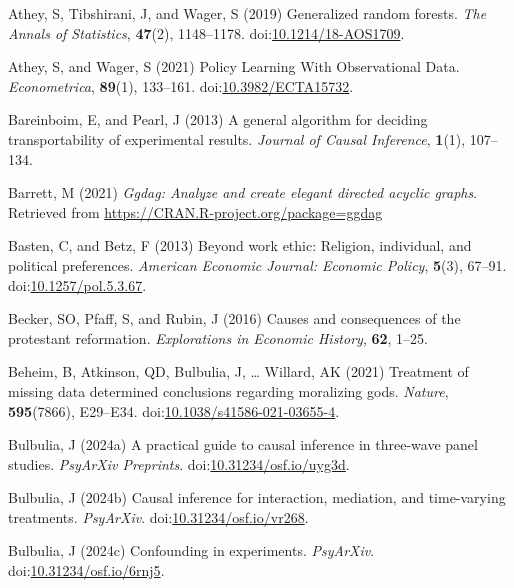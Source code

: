 \documentclass[
  single column]{article}
\newlength{\cslhangindent}
\newenvironment{CSLReferences}[2] %
 {\begin{list}{}{%
  \setlength{\itemindent}{0pt}
  \setlength{\leftmargin}{0pt}
  \setlength{\parsep}{0pt}
  \ifodd #1
   \setlength{\leftmargin}{\cslhangindent}
   \setlength{\itemindent}{-1\cslhangindent}
  \fi
  \setlength{\itemsep}{#2\baselineskip}}}
 {\end{list}}
\begin{document}
\label{refs}
\begin{CSLReferences}{1}{0}
Athey, S, Tibshirani, J, and Wager, S (2019) Generalized random forests.
\emph{The Annals of Statistics}, \textbf{47}(2), 1148--1178.
doi:\href{https://doi.org/10.1214/18-AOS1709}{10.1214/18-AOS1709}.

Athey, S, and Wager, S (2021) Policy Learning With Observational Data.
\emph{Econometrica}, \textbf{89}(1), 133--161.
doi:\href{https://doi.org/10.3982/ECTA15732}{10.3982/ECTA15732}.

Bareinboim, E, and Pearl, J (2013) A general algorithm for deciding
transportability of experimental results. \emph{Journal of Causal
Inference}, \textbf{1}(1), 107--134.

Barrett, M (2021) \emph{Ggdag: Analyze and create elegant directed
acyclic graphs}. Retrieved from
\url{https://CRAN.R-project.org/package=ggdag}

Basten, C, and Betz, F (2013) Beyond work ethic: Religion, individual,
and political preferences. \emph{American Economic Journal: Economic
Policy}, \textbf{5}(3), 67--91.
doi:\href{https://doi.org/10.1257/pol.5.3.67}{10.1257/pol.5.3.67}.

Becker, SO, Pfaff, S, and Rubin, J (2016) Causes and consequences of the
protestant reformation. \emph{Explorations in Economic History},
\textbf{62}, 1--25.

Beheim, B, Atkinson, QD, Bulbulia, J, \ldots{} Willard, AK (2021)
Treatment of missing data determined conclusions regarding moralizing
gods. \emph{Nature}, \textbf{595}(7866), E29--E34.
doi:\href{https://doi.org/10.1038/s41586-021-03655-4}{10.1038/s41586-021-03655-4}.

Bulbulia, J (2024a) A practical guide to causal inference in three-wave
panel studies. \emph{PsyArXiv Preprints}.
doi:\href{https://doi.org/10.31234/osf.io/uyg3d}{10.31234/osf.io/uyg3d}.

Bulbulia, J (2024b) Causal inference for interaction, mediation, and
time-varying treatments. \emph{PsyArXiv}.
doi:\href{https://doi.org/10.31234/osf.io/vr268}{10.31234/osf.io/vr268}.

Bulbulia, J (2024c) Confounding in experiments. \emph{PsyArXiv}.
doi:\href{https://doi.org/10.31234/osf.io/6rnj5}{10.31234/osf.io/6rnj5}.


\end{CSLReferences}
\end{document}
